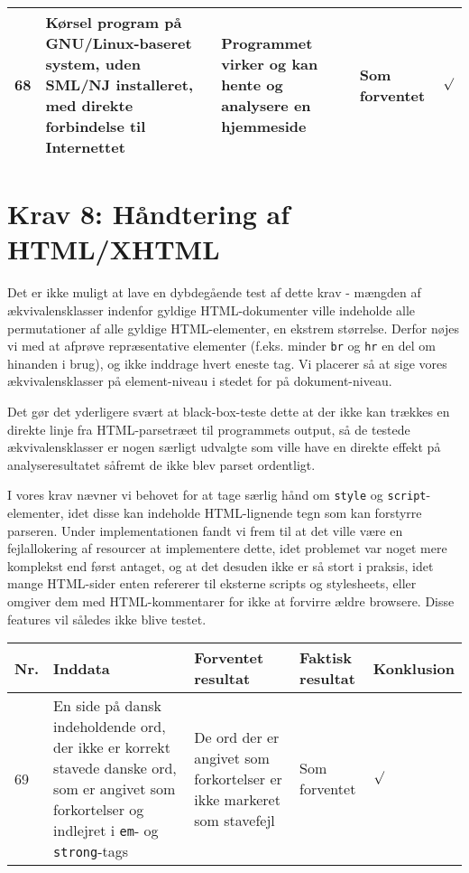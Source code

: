 \documentclass[a4paper,oneside,article]{memoir}
\begin{document}
\begin{landscape}
\begin{longtable}[c]{p{20pt}|p{220pt}|p{130pt}|p{130pt}|r}
68 &
Kørsel program på GNU/Linux-baseret system, uden SML/NJ installeret, med direkte forbindelse til
Internettet &
Programmet virker og kan hente og analysere en hjemmeside &
Som forventet &
$\surd$ \\ \hline

\end{longtable}

\section{Krav 8: Håndtering af HTML/XHTML}

Det er ikke muligt at lave en dybdegående test af dette krav - mængden
af ækvivalensklasser indenfor gyldige HTML-dokumenter ville indeholde
alle permutationer af alle gyldige HTML-elementer, en ekstrem
størrelse. Derfor nøjes vi med at afprøve repræsentative elementer
(f.eks. minder \texttt{br} og \texttt{hr} en del om hinanden i brug),
og ikke inddrage hvert eneste tag. Vi placerer så at sige vores
ækvivalensklasser på element-niveau i stedet for på dokument-niveau.

Det gør det yderligere svært at black-box-teste dette at der ikke kan
trækkes en direkte linje fra HTML-parsetræet til programmets output,
så de testede ækvivalensklasser er nogen særligt udvalgte som ville
have en direkte effekt på analyseresultatet såfremt de ikke blev
parset ordentligt.

I vores krav nævner vi behovet for at tage særlig hånd om
\texttt{style} og \texttt{script}-elementer, idet disse kan indeholde
HTML-lignende tegn som kan forstyrre parseren. Under implementationen
fandt vi frem til at det ville være en fejlallokering af resourcer at
implementere dette, idet problemet var noget mere komplekst end først
antaget, og at det desuden ikke er så stort i praksis, idet mange
HTML-sider enten refererer til eksterne scripts og stylesheets, eller
omgiver dem med HTML-kommentarer for ikke at forvirre ældre
browsere. Disse features vil således ikke blive testet.

\begin{longtable}[c]{p{20pt}|p{220pt}|p{130pt}|p{130pt}|p{50pt}}
\textbf{Nr.} &
\textbf{Inddata} &
\textbf{Forventet resultat} &
\textbf{Faktisk resultat} &
\textbf{Konklusion} \\ \hline

69 &
En side på dansk indeholdende ord, der ikke er korrekt stavede danske
ord, som er angivet som forkortelser og indlejret i \texttt{em}- og
\texttt{strong}-tags &
De ord der er angivet som forkortelser er ikke markeret som stavefejl &
Som forventet &
$\surd$ \\ \hline


\end{longtable}
\end{landscape}
\end{document}
